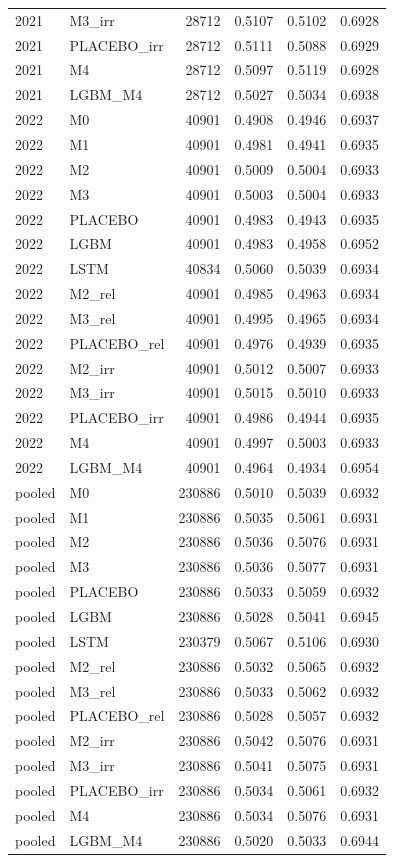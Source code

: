 \begin{tabular}{llrrrr}
2021 & M3\_irr & 28712 & 0.5107 & 0.5102 & 0.6928 \\
2021 & PLACEBO\_irr & 28712 & 0.5111 & 0.5088 & 0.6929 \\
2021 & M4 & 28712 & 0.5097 & 0.5119 & 0.6928 \\
2021 & LGBM\_M4 & 28712 & 0.5027 & 0.5034 & 0.6938 \\
2022 & M0 & 40901 & 0.4908 & 0.4946 & 0.6937 \\
2022 & M1 & 40901 & 0.4981 & 0.4941 & 0.6935 \\
2022 & M2 & 40901 & 0.5009 & 0.5004 & 0.6933 \\
2022 & M3 & 40901 & 0.5003 & 0.5004 & 0.6933 \\
2022 & PLACEBO & 40901 & 0.4983 & 0.4943 & 0.6935 \\
2022 & LGBM & 40901 & 0.4983 & 0.4958 & 0.6952 \\
2022 & LSTM & 40834 & 0.5060 & 0.5039 & 0.6934 \\
2022 & M2\_rel & 40901 & 0.4985 & 0.4963 & 0.6934 \\
2022 & M3\_rel & 40901 & 0.4995 & 0.4965 & 0.6934 \\
2022 & PLACEBO\_rel & 40901 & 0.4976 & 0.4939 & 0.6935 \\
2022 & M2\_irr & 40901 & 0.5012 & 0.5007 & 0.6933 \\
2022 & M3\_irr & 40901 & 0.5015 & 0.5010 & 0.6933 \\
2022 & PLACEBO\_irr & 40901 & 0.4986 & 0.4944 & 0.6935 \\
2022 & M4 & 40901 & 0.4997 & 0.5003 & 0.6933 \\
2022 & LGBM\_M4 & 40901 & 0.4964 & 0.4934 & 0.6954 \\
pooled & M0 & 230886 & 0.5010 & 0.5039 & 0.6932 \\
pooled & M1 & 230886 & 0.5035 & 0.5061 & 0.6931 \\
pooled & M2 & 230886 & 0.5036 & 0.5076 & 0.6931 \\
pooled & M3 & 230886 & 0.5036 & 0.5077 & 0.6931 \\
pooled & PLACEBO & 230886 & 0.5033 & 0.5059 & 0.6932 \\
pooled & LGBM & 230886 & 0.5028 & 0.5041 & 0.6945 \\
pooled & LSTM & 230379 & 0.5067 & 0.5106 & 0.6930 \\
pooled & M2\_rel & 230886 & 0.5032 & 0.5065 & 0.6932 \\
pooled & M3\_rel & 230886 & 0.5033 & 0.5062 & 0.6932 \\
pooled & PLACEBO\_rel & 230886 & 0.5028 & 0.5057 & 0.6932 \\
pooled & M2\_irr & 230886 & 0.5042 & 0.5076 & 0.6931 \\
pooled & M3\_irr & 230886 & 0.5041 & 0.5075 & 0.6931 \\
pooled & PLACEBO\_irr & 230886 & 0.5034 & 0.5061 & 0.6932 \\
pooled & M4 & 230886 & 0.5034 & 0.5076 & 0.6931 \\
pooled & LGBM\_M4 & 230886 & 0.5020 & 0.5033 & 0.6944 \\
\bottomrule
\end{tabular}
